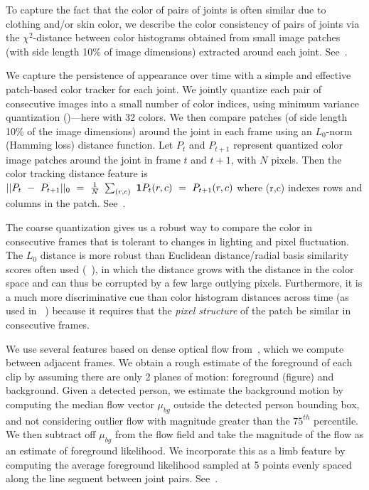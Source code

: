  To capture the fact that the color of pairs of 
joints is often similar due to clothing and/or skin color, we describe the 
color consistency of pairs of joints via the $\chi^2$-distance between color 
histograms obtained from small image patches (with side length 10\% of image 
dimensions) extracted around each joint.  See~.

  We capture the persistence of appearance over 
time with a simple and effective patch-based color tracker for each joint.  We 
jointly quantize each pair of consecutive images into a small number of color 
indices, using minimum variance quantization ()---here with 32 
colors.  We then compare patches (of side length 10\% of the image dimensions) 
around the joint in each frame using an $L_0$-norm (Hamming loss) distance 
function.  Let $P_{t}$ and $P_{t+1}$ represent quantized color image patches 
around the joint in frame $t$ and $t+1$, with $N$ pixels.  Then the color 
tracking distance feature is $ 
||P_t~-~P_{t+1}||_0~=~\frac{1}{N}~\sum_{(r,c)}~\mathbf{1}{P_{t}(r,c)~=~P_{t+1}(r,c)}$ 
where (r,c) indexes rows and columns in the patch.  
See~.

The coarse quantization gives us a robust way to compare the color in 
consecutive frames that is tolerant to changes in lighting and pixel 
fluctuation.  The $L_0$ distance is more robust than Euclidean distance/radial 
basis similarity scores often used (\eg~\citet{gould08ijcv}), in which the 
distance grows with the distance in the color space and can thus be corrupted 
by a few large outlying pixels.  Furthermore, it is a much more discriminative 
cue than color histogram distances across time (as used in \eg~\citet{ren07}) 
because it requires that the {\em pixel structure} of the patch be similar in 
consecutive frames.  

We use several features based on dense optical flow from~\cite{optflow}, which we compute between 
adjacent frames. We obtain a rough estimate of the foreground of each clip by 
assuming there are only 2 planes of motion: foreground (figure) and background.  
Given a detected person, we estimate the background motion by computing the 
median flow vector $\mu_{bg}$ outside the detected person bounding box, and not 
considering outlier flow with magnitude greater than the $75^{th}$ percentile.  
We then subtract off $\mu_{bg}$ from the flow field and take the magnitude of 
the flow as an estimate of foreground likelihood.  We incorporate this as a
limb feature by computing the average foreground likelihood sampled at 5 points 
evenly spaced along the line segment between joint pairs.
See~.

